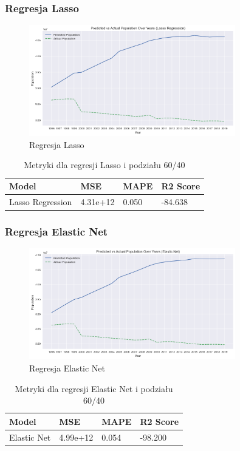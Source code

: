 \documentclass[11pt]{article}
\begin{document}
\subsubsection{Regresja Lasso}
\begin{figure}[H]
        \centering
        \includegraphics[width=0.8\textwidth]{images/lasso996.png}
        \caption{Regresja Lasso}
\end{figure}
\begin{table}[H]
        \centering
        \begin{tabular}{|l|l|l|l|}
        \hline
        Model & MSE & MAPE & R2 Score \\ \hline
        Lasso Regression & 4.31e+12 & 0.050 & -84.638 \\ \hline
        \end{tabular}
        \caption{Metryki dla regresji Lasso i podziału 60/40}
\end{table}
\subsubsection{Regresja Elastic Net}
\begin{figure}[H]
        \centering
        \includegraphics[width=0.8\textwidth]{images/elastic_net996.png}
        \caption{Regresja Elastic Net}
\end{figure}
\begin{table}[H]
        \centering
        \begin{tabular}{|l|l|l|l|}
        \hline
        Model & MSE & MAPE & R2 Score \\ \hline
        Elastic Net & 4.99e+12 & 0.054 & -98.200 \\ \hline
        \end{tabular}
        \caption{Metryki dla regresji Elastic Net i podziału 60/40}
\end{table}
\end{document}
